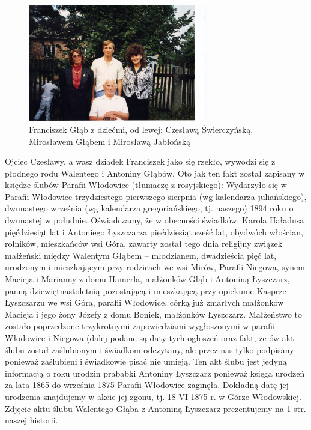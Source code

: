 \begin{figure}[!h]
\begin{center}
\includegraphics[width=0.7\textwidth]{zdjecia/franciszek_glab_z_dziecmi.jpg}
\caption[Franciszek Głąb z dziećmi]{Franciszek Głąb z dziećmi, od lewej: Czesławą Świerczyńską, Mirosławem Głąbem i Mirosławą Jabłońską}
\label{rys:franciszek_glab_z_dziecmi}
\end{center}
\end{figure}

Ojciec Czesławy, a wasz dziadek Franciszek jako się rzekło, wywodzi się z płodnego rodu Walentego i Antoniny Głąbów. Oto jak ten fakt został zapisany w księdze ślubów Parafii Włodowice (tłumaczę z rosyjskiego): Wydarzyło się w Parafii Włodowice trzydziestego pierwszego sierpnia (wg kalendarza juliańskiego), dwunastego września (wg kalendarza gregoriańskiego, tj. naszego) 1894 roku o dwunastej w południe. Oświadczamy, że w obecności świadków: Karola Haładusa pięćdziesiąt lat i Antoniego Łyszczarza pięćdziesiąt sześć lat, obydwóch włościan, rolników, mieszkańców wsi Góra, zawarty został tego dnia religijny związek małżeński między Walentym Głąbem – młodzianem, dwadzieścia pięć lat, urodzonym i mieszkającym przy rodzicach we wsi Mirów, Parafii Niegowa, synem Macieja i Marianny z domu Hamerla, małżonków Głąb i Antoniną Łyszczarz, panną dziewiętnastoletnią pozostającą i mieszkającą przy opiekunie Kasprze Łyszczarzu we wsi Góra, parafii Włodowice, córką już zmarłych małżonków Macieja i jego żony Józefy z domu Boniek, małżonków Łyszczarz. Małżeństwo to zostało poprzedzone trzykrotnymi zapowiedziami wygłoszonymi w parafii Włodowice i Niegowa (dalej podane są daty tych ogłoszeń oraz fakt, że ów akt ślubu został zaślubionym i świadkom odczytany, ale przez nas tylko podpisany ponieważ zaślubieni i świadkowie pisać nie umieją. Ten akt ślubu jest jedyną informacją o roku urodzin prababki Antoniny Łyszczarz ponieważ księga urodzeń za lata 1865 do września 1875 Parafii Włodowice zaginęła. Dokładną datę jej urodzenia znajdujemy w akcie jej zgonu, tj. 18 VI 1875 r. w Górze Włodowskiej. Zdjęcie aktu ślubu Walentego Głąba z Antoniną Łyszczarz prezentujemy na 1 str. naszej historii.

